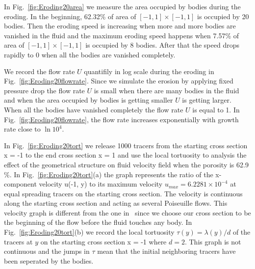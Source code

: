 \documentclass[preprint, 10pt]{elsarticle}
\begin{document}
{\color{red}
In Fig.~\ref{fig:Eroding20area} we
measure the area occupied by bodies 
during the eroding. In the beginning, 62.32\% of area of $[-1,1] \times
[-1,1]$ is occupied by 20 bodies. Then the eroding speed is increasing
when more and more bodies are vanished in the fluid and 
the maximum eroding speed happens when 7.57\% of area of $[-1,1] \times
[-1,1]$ is occupied by 8 bodies. After that the speed drops rapidly to 0 when
all the bodies are vanished completely.

We record the flow rate $U$ quantifily in log scale
during the eroding in Fig.~\ref{fig:Eroding20flowrate}. 
Since we simulate the erosion by applying fixed pressure drop 
the flow rate $U$ is small when there are many bodies in the fluid and 
when the area occupied by bodies is getting smaller $U$ is getting larger.
When all the bodies have vanished completely the flow rate $U$ is equal to 1.
In Fig.~\ref{fig:Eroding20flowrate}, the flow rate increases exponentially 
with growth rate close to $\ln10^4$. 


In Fig.~\ref{fig:Eroding20tort} we release 1000 tracers 
from the starting cross section x = -1 to 
the end cross section x = 1 and 
use the local tortuosity to analysis the effect
of the geometrical structure on fluid velocity field when the porosity is 62.9 \%.
In Fig.~\ref{fig:Eroding20tort}(a) the graph represents the ratio of the
x-component velocity u(-1, y) to its maximum velocity $u_{max}=6.2281
\times 10^{-4}$ at equal spreading tracers on the starting cross section.
The velocity is continuous along the starting cross section and
acting as several Poiseuille flows. This velocity graph is different
from the one in~\cite{matyka2008tortuosity} since we choose our cross
section to be the beginning of the flow before the fluid touches any
body. In Fig.~\ref{fig:Eroding20tort}(b) we record the local tortuosity
$\tau(y)=\lambda(y)/d$
of the tracers at $y$ on the starting cross section x = -1 
where $d = 2$.
This graph is not continuous
and the jumps in $\tau$ mean that the initial neighboring tracers have been
seperated by the bodies. 
}
\end{document}
